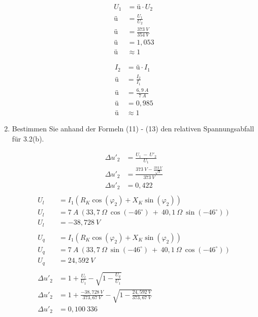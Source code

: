 \begin{enumerate}[label=\alph*)]
	      \begin{minipage}[r]{0.5\linewidth}
		      \begin{align*}
			      U_1 & = ü\cdot U_2            \\
			      ü   & = \frac{U_1}{U_2}       \\
			      ü   & = \frac{373\ V}{354\ V} \\
			      ü   & = 1,053                 \\
			      ü   & \approx 1
		      \end{align*}
	      \end{minipage}
	      \begin{minipage}[l]{0.5\linewidth}
		      \begin{align*}
			      I_2 & = ü\cdot I_1          \\
			      ü   & = \frac{I_2}{I_1}     \\
			      ü   & = \frac{6,9\ A}{7\ A} \\
			      ü   & = 0,985               \\
			      ü   & \approx 1
		      \end{align*}
	      \end{minipage}

	\item Bestimmen Sie anhand der Formeln (11) - (13) den relativen Spannungsabfall für
	      3.2(b).

	      \begin{align*}
		      \Delta u'_2 & = \frac{U_1\ -\ U'_2}{U_1}                       \\
		      \Delta u'_2 & = \frac{373\ V -\frac{373\ V}{\sqrt{3}}}{373\ V} \\
		      \Delta u'_2 & = 0,422                                          \\
	      \end{align*}
	      \begin{align*}
		      U_l         & = I_1(R_K\cos(\varphi_2)+X_K\sin(\varphi_2))                              \\
		      U_l         & = 7\ A\ (33,7\ \Omega\ \cos(-46^\circ)\ +\ 40,1\ \Omega\ \sin(-46^\circ)) \\
		      U_l         & = -38,728\ V                                                              \\
		      \\
		      U_q         & = I_1(R_K\cos(\varphi_2)+X_K\sin(\varphi_2))                              \\
		      U_q         & = 7\ A\ (33,7\ \Omega\ \sin(-46^\circ)\ +\ 40,1\ \Omega\ \cos(-46^\circ)) \\
		      U_q         & = 24,592\ V                                                               \\
		      \\
		      \Delta u'_2 & = 1+\frac{U_l}{U_1} - \sqrt{1-\frac{U_q}{U_1}}                            \\
		      \Delta u'_2 & = 1+\frac{-38,728\ V}{373,67\ V} - \sqrt{1-\frac{24,592\ V}{373,67\ V}}   \\
		      \Delta u'_2 & = 0,100\ 336
	      \end{align*}


\end{enumerate}
